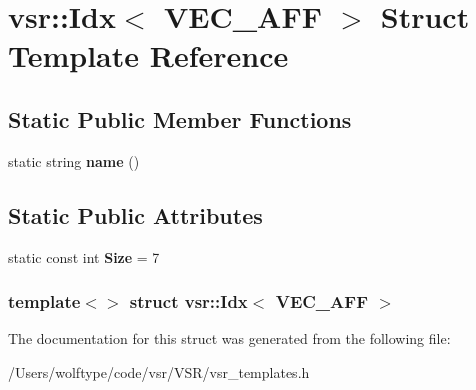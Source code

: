 \hypertarget{structvsr_1_1_idx_3_01_v_e_c___a_f_f_01_4}{\section{vsr\-:\-:Idx$<$ V\-E\-C\-\_\-\-A\-F\-F $>$ Struct Template Reference}
\label{structvsr_1_1_idx_3_01_v_e_c___a_f_f_01_4}
}
\subsection*{Static Public Member Functions}
\begin{DoxyCompactItemize}
\item 
\hypertarget{structvsr_1_1_idx_3_01_v_e_c___a_f_f_01_4_a09c0f3ecb0d58bc6d1348ff697cde145}{static string {\bfseries name} ()}\label{structvsr_1_1_idx_3_01_v_e_c___a_f_f_01_4_a09c0f3ecb0d58bc6d1348ff697cde145}

\end{DoxyCompactItemize}
\subsection*{Static Public Attributes}
\begin{DoxyCompactItemize}
\item 
\hypertarget{structvsr_1_1_idx_3_01_v_e_c___a_f_f_01_4_abf12a2ab947d77c2bd8c455d32de244a}{static const int {\bfseries Size} = 7}\label{structvsr_1_1_idx_3_01_v_e_c___a_f_f_01_4_abf12a2ab947d77c2bd8c455d32de244a}

\end{DoxyCompactItemize}
\subsubsection*{template$<$$>$ struct vsr\-::\-Idx$<$ V\-E\-C\-\_\-\-A\-F\-F $>$}



The documentation for this struct was generated from the following file\-:\begin{DoxyCompactItemize}
\item 
/\-Users/wolftype/code/vsr/\-V\-S\-R/vsr\-\_\-templates.\-h\end{DoxyCompactItemize}
